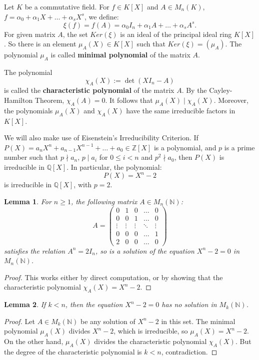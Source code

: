 \documentclass{article}
\theoremstyle{plain}
\newtheorem{lemma}{Lemma}[section]
\theoremstyle{definition}
\begin{document}
Let $K$ be a commutative field. For $f \in K[X]$ and $A \in M_n(K)$, $f = \alpha_0 + \alpha_1X + \dots + \alpha_s X^s$, we define:
$$\xi(f) = f(A) = \alpha_0I_n + \alpha_1 A + \dots + \alpha_s A^s.$$ 
For given matrix $A$, the set $Ker(\xi)$ is an ideal of the principal ideal ring $K[X]$. So there is an element $\mu_A(X) \in K[X]$ such that $Ker(\xi) = (\mu_A)$. The polynomial $\mu_A$ is called {\bf minimal polynomial} of the matrix $A$. 

The polynomial
$$\chi_A(X) := \det(X I_n - A)$$
is called the {\bf characteristic polynomial} of the matrix $A$. By the Cayley-Hamilton Theorem, $\chi_A(A) = 0$. It follows that $\mu_A(X) \mid \chi_A(X)$. Moreover, the polynomials $\mu_A(X)$ and $\chi_A(X)$ have the same irreducible factors in $K[X]$. 

We will also make use of Eisenstein's Irreducibility Criterion. If $P(X) = a_n X^n + a_{n-1} X^{n-1} + \dots + a_0 \in \mathbb Z[X]$ is a polynomial, and $p$ is a prime number such that $p \nmid a_n$, $p \mid a_i$ for $0 \leq i < n$ and $p^2 \nmid a_0$, then $P(X)$ is irreducible in $\mathbb Q[X]$. In particular, the polynomial:
$$ P(X) = X^n - 2 $$
is irreducible in $\mathbb Q[X]$, with $p = 2$. 

\begin{lemma}\label{lemmasolution}
For $n \geq 1$, the following matrix $A \in M_n(\mathbb N)$:
$$ A =
\begin{pmatrix}
0 & 1 & 0 & \dots & 0 \\
0 & 0 & 1 & \dots & 0 \\
\vdots & \vdots & \vdots & \ddots & \vdots \\
0 & 0 & 0 & \dots & 1 \\
2 & 0 & 0 & \dots & 0 
\end{pmatrix}
$$
satisfies the relation $A^n = 2I_n$, so is a solution of the equation $X^n - 2 = 0$ in $M_n(\mathbb N)$. 
\end{lemma} 

\begin{proof}
This works either by direct computation, or by showing that the characteristic polynomial $\chi_A(X) = X^n - 2$. 
\end{proof} 

\begin{lemma}\label{lemmanosmallerdim} 
If $k < n$, then the equation $X^n - 2 = 0$ has no solution in $M_k(\mathbb N)$. 
\end{lemma}

\begin{proof} Let $A \in M_k(\mathbb N)$ be any solution of $X^n - 2$ in this set. The minimal polynomial $\mu_A(X)$ divides $X^n - 2$, which is irreducible, so $\mu_A(X) = X^n-2$. On the other hand, $\mu_A(X)$ divides the characteristic polynomial $\chi_A(X)$. But the degree of the characteristic polynomial is $k < n$, contradiction. 
\end{proof} 
\end{document}

